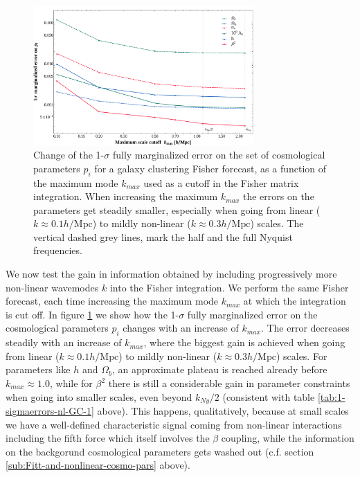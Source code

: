 \begin{figure}[h]
\footnotesize
\centering{}
\includegraphics[width=0.75\textwidth]{Chapters/fitting-funcs/figures/kmaxvariationGC-sigmav}
\protect\protect
\caption[Effect of non-linear scales on the 1$\sigma$ errors on cosmological parameters.]{\label{fig:kmax-change-lin-nonlin} 
Change of the 1-$\sigma$ fully
marginalized error on the set of cosmological parameters $p_{i}$
for a galaxy clustering Fisher forecast, as a function of the maximum
mode $k_{max}$ used as a cutoff in the Fisher matrix integration.
When increasing the maximum $k_{max}$ the errors on the parameters
get steadily smaller, especially when going from linear ($k\approx0.1h/\mbox{Mpc}$)
to mildly non-linear ($k\approx0.3h/\mbox{Mpc}$) scales. The vertical
dashed grey lines, mark the half and the full Nyquist frequencies.}
\end{figure}
\normalsize

We now test the gain in information obtained by including progressively
more non-linear wavemodes $k$ into the Fisher integration. We perform
the same Fisher forecast, each time increasing the maximum mode $k_{max}$
at which the integration is cut off. In figure \ref{fig:kmax-change-lin-nonlin}
we show how the 1-$\sigma$ fully marginalized error on the cosmological
parameters $p_{i}$ changes with an increase of $k_{max}$. The error
decreases steadily with an increase of $k_{max}$, where the biggest
gain is achieved when going from linear ($k\approx0.1h/\mbox{Mpc}$)
to mildly non-linear ($k\approx0.3h/\mbox{Mpc}$) scales. For parameters
like $h$ and $\Omega_{b}$, an approximate plateau is reached already
before $k_{max}\approx1.0$, while for $\beta^{2}$ there is still
a considerable gain in parameter constraints when going into smaller
scales, even beyond $k_{Ny}/2$ (consistent with table \ref{tab:1-sigmaerrors-nl-GC-1}
above). This happens, qualitatively, because at small scales we have
a well-defined characteristic signal coming from non-linear interactions
including the fifth force which itself involves the $\beta$ coupling,
while the information on the backgorund cosmological parameters gets
washed out (c.f. section \ref{sub:Fitt-and-nonlinear-cosmo-pars}
above).

